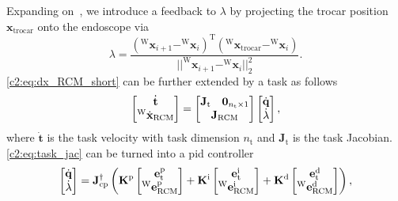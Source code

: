 Expanding on~\cite{aghakhani2013task}, we introduce a feedback to $\lambda$ by projecting the trocar position $\mathbf{x}_\text{trocar}$ onto the endoscope via
\begin{equation}
    \lambda = \frac{(^\text{W}\mathbf{x}_{i+1} - ^\text{W}\mathbf{x}_i)^\text{T}(^\text{W}\mathbf{x}_\text{trocar}-^\text{W}\mathbf{x}_i)}{||^\text{W}\mathbf{x}_{i+1}-^\text{W}\mathbf{x}_i||_2^2}.
\end{equation}
\eqref{c2:eq:dx_RCM_short} can be further extended by a task as follows
\begin{equation}
    \begin{bmatrix}\dot{\mathbf{t}} \\ ^\text{W}\dot{\mathbf{x}}_\text{RCM}\end{bmatrix} =
    \begin{bmatrix}\mathbf{J}_\text{t} & \mathbf{0}_{n_\text{t}\times 1} \\ \multicolumn{2}{c}{\mathbf{J}_\text{RCM}}
    \end{bmatrix}
    \begin{bmatrix}\dot{\mathbf{q}}\\\dot{\lambda}\end{bmatrix},
    \label{c2:eq:task_jac}
\end{equation}
where $\dot{\mathbf{t}}$ is the task velocity with task dimension $n_\text{t}$ and $\mathbf{J}_\text{t}$ is the task Jacobian. \eqref{c2:eq:task_jac} can be turned into a \acrshort{pid} controller
\begin{equation}
    \centering
    \begin{bmatrix}
        \dot{\mathbf{q}}\\
        \dot{\lambda}
    \end{bmatrix} = 
    \mathbf{J}_\text{cp}^{\dagger}
    \left(
        \mathbf{K}^\text{p}
        \begin{bmatrix}
            \mathbf{e}_\text{t}^\text{p}\\
            ^\text{W}\mathbf{e}_\text{RCM}^\text{p}
        \end{bmatrix} +
        \mathbf{K}^\text{i}
        \begin{bmatrix}
            \mathbf{e}_\text{t}^\text{i}\\
            ^\text{W}\mathbf{e}_\text{RCM}^\text{i}
        \end{bmatrix} +
        \mathbf{K}^\text{d}
        \begin{bmatrix}
            \mathbf{e}_\text{t}^\text{d}\\
            ^\text{W}\mathbf{e}_\text{RCM}^\text{d}
        \end{bmatrix}
    \right),
    \label{c2:eq:pid}
\end{equation}
